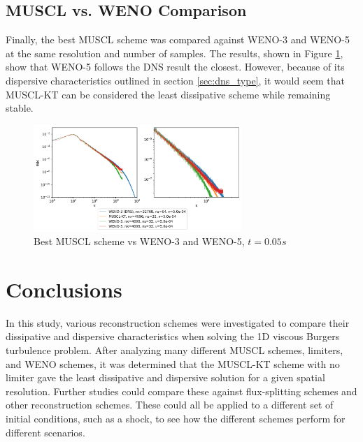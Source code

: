 \documentclass[conf]{new-aiaa}
\begin{document}


\subsection{MUSCL vs. WENO Comparison} \label{sec:muscl_vs_weno}

Finally, the best MUSCL scheme was compared against WENO-3 and WENO-5 at the
same resolution and number of samples. The results, shown in Figure
\ref{fig:best_muscl_vs_weno}, show that WENO-5 follows the DNS result the
closest. However, because of its dispersive characteristics outlined in section
\ref{sec:dns_type}, it would seem that MUSCL-KT can be considered the least
dissipative scheme while remaining stable.

\begin{figure}[hbt!]
	\centering
	\includegraphics[width=0.7\textwidth]{figures/Best_MUSCL_vs_WENO_35_Ek_vs_k.png}
	\caption{Best MUSCL scheme vs WENO-3 and WENO-5, $t=0.05s$}
	\label{fig:best_muscl_vs_weno}
\end{figure}

\section{Conclusions}
In this study, various reconstruction schemes were investigated to compare
their dissipative and dispersive characteristics when solving the 1D viscous
Burgers turbulence problem. After analyzing many different MUSCL schemes,
limiters, and WENO schemes, it was determined that the MUSCL-KT scheme with no
limiter gave the least dissipative and dispersive solution for a given spatial
resolution. Further studies could compare these against flux-splitting schemes
and other reconstruction schemes. These could all be applied to a different set
of initial conditions, such as a shock, to see how the different schemes
perform for different scenarios.


\end{document}
